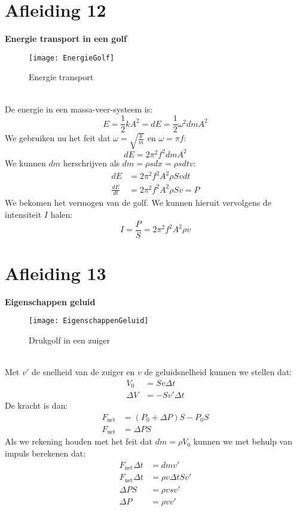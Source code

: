 \documentclass[a4paper,kul]{kulakarticle} %
\begin{document}
\section{Afleiding 12}
\textbf{Energie transport in een golf}\\
\begin{figure}[h]
	\centering
	\texttt{[image: EnergieGolf]}
	\caption[Energie transport]{Energie transport}
	\label{fig:energietransport}
\end{figure}\\
De energie in een massa-veer-systeem is:
\begin{equation*}
	E = \frac{1}{2}kA^2 = dE = \frac{1}{2}\omega^2dmA^2
\end{equation*}
We gebruiken nu het feit dat $\omega = \sqrt{\frac{k}{m}} $ en $\omega = \pi f$:
\begin{equation*}
	dE = 2\pi^2f^2dmA^2
\end{equation*}
We kunnen $dm$ herschrijven als $dm = \rho sdx = \rho sdtv$:
\begin{align*}
	dE &= 2\pi^2f^2A^2\rho Svdt\\
	\frac{dE}{dt} &= 2\pi^2f^2A^2\rho Sv = P
\end{align*}
We bekomen het vermogen van de golf. We kunnen hieruit vervolgens de intensiteit $I$ halen:
\begin{equation*}
	I = \frac{P}{S} = 2\pi^2f^2A^2\rho v
\end{equation*}
\newpage
\section{Afleiding 13}
\textbf{Eigenschappen geluid}\\
\begin{figure}[h]
	\centering
	\texttt{[image: EigenschappenGeluid]}
	\caption[Zuiger]{Drukgolf in een zuiger}
	\label{fig:drukgolfzuiger}
\end{figure}\\
Met $v'$ de snelheid van de zuiger en $v$ de geluidsnelheid kunnen we stellen dat:
\begin{align*}
	V_0 &=Sv\Delta t\\
	\Delta V &= -Sv'\Delta t
\end{align*}
De kracht is dan:
\begin{align*}
	F_{\text{net}} &= (P_0+\Delta P)S-P_0S\\
	F_{\text{net}}&= \Delta PS
\end{align*}
Als we rekening houden met het feit dat $dm=\rho V_0$ kunnen we met behulp van impuls berekenen dat:
\begin{align*}
	F_{\text{net}} \Delta t &=dmv'\\
	F_{\text{net}}\Delta t &= \rho v\Delta tSv'\\
	\Delta PS &= \rho vsv'\\
	\Delta P &= \rho vv'
\end{align*}
\newpage
\end{document}
